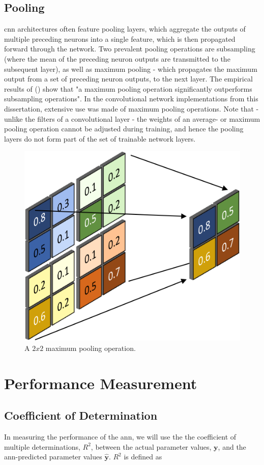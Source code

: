 \documentclass[11pt,oneside,openany,a4paper,english, report, goldenblock
]{usthesis}
\begin{document}
\subsection{Pooling}
\acrshort{cnn} architectures often feature pooling layers, which aggregate the outputs of multiple preceding neurons into a single feature, which is then propagated forward through the network. Two prevalent pooling operations are subsampling (where the mean of the preceding neuron outputs are transmitted to the subsequent layer), as well as maximum pooling - which propagates the maximum output from a set of preceding neuron outputs, to the next layer. The empirical results of  (\citeyear{Scherer2010}) show that "a maximum pooling operation significantly outperforms subsampling operations". In the convolutional network implementations from this dissertation, extensive use was made of maximum pooling operations. Note that - unlike the filters of a convolutional layer - the weights of an average- or maximum pooling operation cannot be adjusted during training, and hence the pooling layers do not form part of the set of trainable network layers.

\begin{figure}[h]
	\centering
	\includegraphics[width=0.4\linewidth]{Images/Diagrams/Max-Pooling_Operation}
	\caption[A $2x2$ maximum pooling operation.]{A $2x2$ maximum pooling operation.}
	\label{fig:max-poolingoperation}
\end{figure}


\section{Performance Measurement}
\subsection{Coefficient of Determination}
In measuring the performance of the \acrshort{ann}, we will use the the coefficient of multiple determinations, $ R^2 $, between the actual parameter values, $ \mathbf{y} $, and the \acrshort{ann}-predicted parameter values $ \mathbf{\hat{y}}$. $ R^2 $ is defined as
\end{document}
